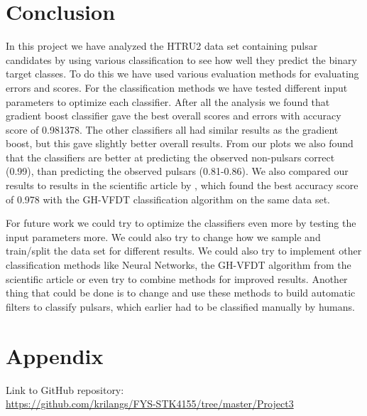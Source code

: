 \documentclass[12pt,a4paper,english]{article}
\begin{document}
\section{Conclusion}
\label{sect:Conclusion}
In this project we have analyzed the HTRU2 data set containing pulsar candidates by using various classification to see how well they predict the binary target classes. To do this we have used various evaluation methods for evaluating errors and scores. For the classification methods we have tested different input parameters to optimize each classifier. After all the analysis we found that gradient boost classifier gave the best overall scores and errors with accuracy score of 0.981378. The other classifiers all had similar results as the gradient boost, but this gave slightly better overall results. From our plots we also found that the classifiers are better at predicting the observed non-pulsars correct (0.99), than predicting the observed pulsars (0.81-0.86). We also compared our results to results in the scientific article by \citet{pulsar_art}, which found the best accuracy score of 0.978 with the GH-VFDT classification algorithm on the same data set.

For future work we could try to optimize the classifiers even more by testing the input parameters more. We could also try to change how we sample and train/split the data set for different results. We could also try to implement other classification methods like Neural Networks, the GH-VFDT algorithm from the scientific article or even try to combine methods for improved results. Another thing that could be done is to change and use these methods to build automatic filters to classify pulsars, which earlier had to be classified manually by humans.

\appendix
\section{Appendix}
\label{sect:Appendix}
Link to GitHub repository:\\
\url{https://github.com/krilangs/FYS-STK4155/tree/master/Project3}



\end{document}
